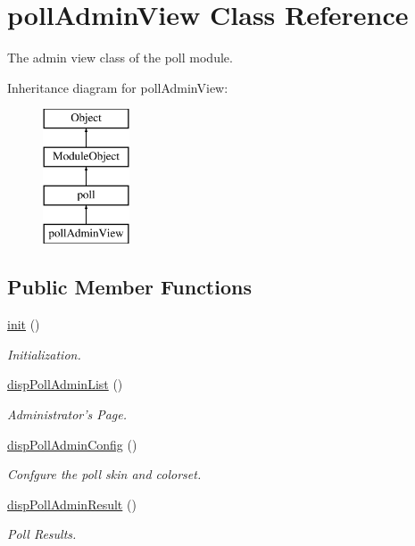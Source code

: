 \hypertarget{classpollAdminView}{\section{poll\+Admin\+View Class Reference}
\label{classpollAdminView}
}


The admin view class of the poll module.  


Inheritance diagram for poll\+Admin\+View\+:\begin{figure}[H]
\begin{center}
\leavevmode
\includegraphics[height=4.000000cm]{classpollAdminView}
\end{center}
\end{figure}
\subsection*{Public Member Functions}
\begin{DoxyCompactItemize}
\item 
\hyperlink{classpollAdminView_af5d64cefd4797770bd159956c19bb48b}{init} ()
\begin{DoxyCompactList}\small\item\em Initialization. \end{DoxyCompactList}\item 
\hyperlink{classpollAdminView_a6c6fb22f667d20327d6770a3227c2875}{disp\+Poll\+Admin\+List} ()
\begin{DoxyCompactList}\small\item\em Administrator's Page. \end{DoxyCompactList}\item 
\hyperlink{classpollAdminView_a187abafd38bcaa2b0f72b4f08e667be8}{disp\+Poll\+Admin\+Config} ()
\begin{DoxyCompactList}\small\item\em Confgure the poll skin and colorset. \end{DoxyCompactList}\item 
\hyperlink{classpollAdminView_ae05b1788a9f40401af695a961137663a}{disp\+Poll\+Admin\+Result} ()
\begin{DoxyCompactList}\small\item\em Poll Results. \end{DoxyCompactList}\end{DoxyCompactItemize}
